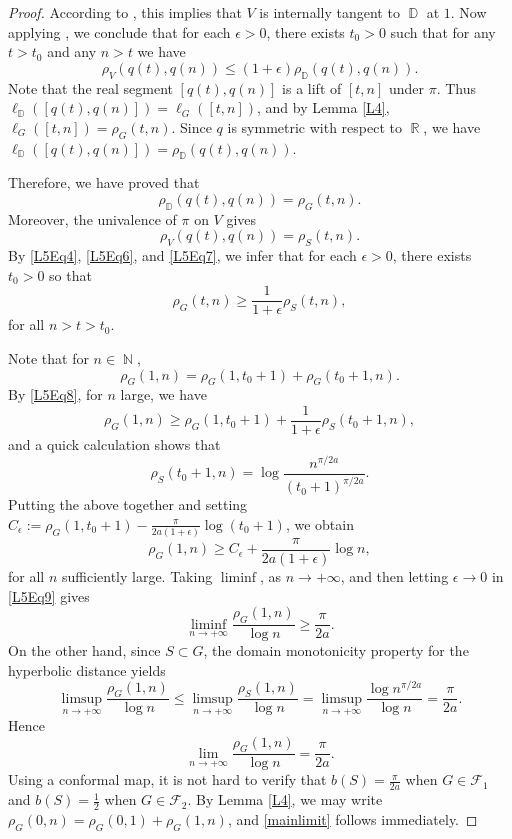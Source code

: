 \documentclass[11pt, letterpaper,leqno]{amsart}
\numberwithin{equation}{section}
\theoremstyle{definition}
\DeclareMathOperator{\D}{\mathbb{D}}
\DeclareMathOperator{\N}{\mathbb{N}}
\DeclareMathOperator{\R}{\mathbb{R}}
\begin{document}
\begin{proof}
According to \cite[Definition 5.6]{CZ}, this implies that $V$ is internally tangent to $\D$ at $1$. Now applying \cite[Theorem 5.10 (c)]{CZ}, we conclude that for each $\epsilon>0$, there exists $t_0>0$ such that for any $t>t_0$ and any $n>t$ we have
\begin{equation}\label{L5Eq4}
\rho_V(q(t),q(n))\leq (1+\epsilon)\rho_{\D}(q(t),q(n)).
\end{equation}
Note that the real segment $[q(t),q(n)]$ is a lift of $[t,n]$ under $\pi$. Thus $\ell_{\D}([q(t),q(n)])=\ell_G([t,n])$, and by Lemma \ref{L4}, $\ell_G([t,n])=\rho_G(t,n)$. Since $q$ is symmetric with respect to $\R$, we have $\ell_{\D}([q(t),q(n)])=\rho_{\D}(q(t),q(n))$.

Therefore, we have proved that
\begin{equation}\label{L5Eq6}
\rho_{\D}(q(t),q(n))=\rho_G(t,n).
\end{equation} 
Moreover, the univalence of $\pi$ on $V$ gives
\begin{equation}\label{L5Eq7}
\rho_V(q(t),q(n))=\rho_S(t,n).
\end{equation}
By \eqref{L5Eq4}, \eqref{L5Eq6}, and \eqref{L5Eq7}, we infer that for each $\epsilon>0$, there exists $t_0>0$ so that
\begin{equation}\label{L5Eq8}
\rho_G(t,n)\geq\frac{1}{1+\epsilon}\rho_S(t,n),
\end{equation}
for all $n>t>t_0$. 

Note that for $n\in\N$,
\[
\rho_G(1,n)=\rho_G(1,t_0+1)+\rho_G(t_0+1,n).
\]
By \eqref{L5Eq8}, for $n$ large, we have
\[
\rho_G(1,n)\geq \rho_G(1,t_0+1)+\frac{1}{1+\epsilon}\rho_S(t_0+1,n),
\]
and a quick calculation shows that 
\[
\rho_S(t_0+1,n)=\log\frac{n^{\pi/2a}}{(t_0+1)^{\pi/2a}}.
\]
Putting the above together and setting $C_\epsilon:=\rho_G(1,t_0+1)-\frac{\pi}{2a(1+\epsilon)}\log(t_0+1)$, we obtain
\begin{equation}\label{L5Eq9}
	\rho_G(1,n)\geq C_\epsilon+\frac{\pi}{2a(1+\epsilon)}\log n,
\end{equation}
for all $n$ sufficiently large. Taking $\liminf$, as $n\to +\infty$, and then letting $\epsilon\to 0$ in \eqref{L5Eq9} gives
\[
	\liminf_{n\to +\infty}\frac{\rho_G(1,n)}{\log n} \geq \frac{\pi}{2a}.
\]
On the other hand, since $S\subset G$, the domain monotonicity property for the hyperbolic distance yields
\[
\limsup_{n\to +\infty}\frac{\rho_G(1,n)}{\log n}\leq \limsup_{n\to +\infty}\frac{\rho_S(1,n)}{\log n}=\limsup_{n\to +\infty}\frac{\log n^{\pi/2a}}{\log n}=\frac{\pi}{2a}.
\]
Hence
\[
\lim_{n\to +\infty}\frac{\rho_G(1,n)}{\log n} = \frac{\pi}{2a}.
\]
Using a conformal map, it is not hard to verify that $b(S)=\frac{\pi}{2a}$ when $G\in\mathcal{F}_1$ and $b(S)=\frac{1}{2}$ when $G\in\mathcal{F}_2$. By Lemma \ref{L4}, we may write $\rho_G(0,n)=\rho_G(0,1)+\rho_G(1,n)$, and \eqref{mainlimit} follows immediately. 
\end{proof}
\end{document}
